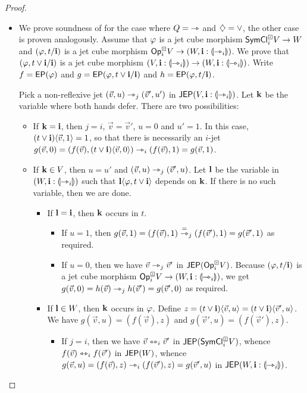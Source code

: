 \documentclass[a4paper]{memoir}
\begin{document}
\begin{proof}
\begin{itemize}
		\item We prove soundness of  for the case where $Q = {\rightarrowtriangle}$ and $\mathbin{\diamondsuit} = \vee$, the other case is proven analogously.
		Assume that $\varphi$ is a jet cube morphism $\mathsf{SymCl}^\boxdot_i V \to W$ and $(\varphi, t / \mathbf{i})$ is a jet cube morphism ${\mathsf{Op}}^\boxdot_i V \to (W, \mathbf{i} : {\llparenthesis \rightarrowtriangle_i \rrparenthesis})$.
		We prove that $(\varphi, t \vee \mathbf{i} / \mathbf{i})$ is a jet cube morphism $(V, \mathbf{i} : {\llparenthesis \rightarrowtriangle_i \rrparenthesis}) \to (W, \mathbf{i} : {\llparenthesis \rightarrowtriangle_i \rrparenthesis})$.
		Write $f = \mathsf{EP}(\varphi)$ and $g = \mathsf{EP}(\varphi, t \vee \mathbf{i} / \mathbf{i})$ and $h = \mathsf{EP}(\varphi, t / \mathbf{i})$.
		
		Pick a non-reflexive jet $(\vec v, u) \rightarrowtriangle_j (\vec v', u')$ in $\mathsf{JEP}(V, \mathbf{i} : {\llparenthesis \rightarrowtriangle_i \rrparenthesis})$.
		Let $\mathbf{k}$ be the variable where both hands defer.
		There are two possibilities:
		\begin{itemize}
			\item If $\mathbf{k} = \mathbf{i}$, then $j = i$, $\vec v = \vec v'$, $u = 0$ and $u' = 1$.
			In this case, $(t \vee \mathbf{i}) \langle \vec v, 1 \rangle = 1$, so that there is necessarily an $i$-jet $g(\vec v, 0) = (f(\vec v), (t \vee \mathbf{i}) \langle \vec v, 0 \rangle) \rightarrowtriangle_i (f(\vec v), 1) = g(\vec v, 1)$.
			\item If $\mathbf{k} \in V$, then $u = u'$ and $(\vec v, u) \rightarrowtriangle_j (\vec v', u)$. Let $\mathbf{l}$ be the variable in $(W, \mathbf{i} : {\llparenthesis \rightarrowtriangle_i \rrparenthesis})$ such that $\mathbf{l} \langle \varphi, t \vee \mathbf{i} \rangle$ depends on $\mathbf{k}$.
			If there is no such variable, then we are done.
			\begin{itemize}
				\item If $\mathbf{l} = \mathbf{i}$, then $\mathbf{k}$ occurs in $t$.
				\begin{itemize}
					\item If $u = 1$, then $g(\vec v, 1) = (f(\vec v), 1) \overset{=}{\rightarrowtriangle}_j (f(\vec v'), 1) = g(\vec v', 1)$ as required.
					\item If $u = 0$, then we have $\vec v \rightarrowtriangle_j \vec v'$ in $\mathsf{JEP}({\mathsf{Op}}^\boxdot_i V)$.
					Because $(\varphi, t / \mathbf{i})$ is a jet cube morphism ${\mathsf{Op}}^\boxdot_i V \to (W, \mathbf{i} : {\llparenthesis \rightarrowtriangle_i \rrparenthesis})$, we get
					$g(\vec v, 0) = h(\vec v) \rightarrowtriangle_j h(\vec v') = g(\vec v', 0)$ as required.
				\end{itemize}
				\item If $\mathbf{l} \in W$, then $\mathbf{k}$ occurs in $\varphi$.
				Define $z = (t \vee \mathbf{i}) \langle \vec v, u \rangle = (t \vee \mathbf{i}) \langle \vec v', u \rangle$.
				We have $g(\vec v, u) = (f(\vec v), z)$ and $g(\vec v', u) = (f(\vec v'), z)$.
				\begin{itemize}
					\item If $j = i$, then we have $\vec v \leftrightarrowtriangle_i \vec v'$ in $\mathsf{JEP}(\mathsf{SymCl}^\boxdot_i V)$, whence $f(\vec v) \leftrightarrowtriangle_i f(\vec v')$ in $\mathsf{JEP}(W)$, whence $g(\vec v, u) = (f(\vec v), z) \rightarrowtriangle_i (f(\vec v'), z) = g(\vec v', u)$ in $\mathsf{JEP}(W, \mathbf{i} : {\llparenthesis \rightarrowtriangle_i \rrparenthesis})$.

\end{itemize}
\end{itemize}
\end{itemize}
\end{itemize}
\end{proof}
\end{document}
